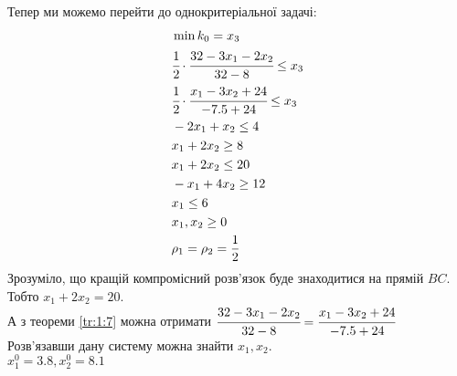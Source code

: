 \begin{exs}
Тепер ми можемо перейти до однокритеріальної задачі:
\begin{eqnarray*}
&\min k_0=x_3 \\
&\cfrac12 \cdot \cfrac{32-3x_1-2x_2}{32-8} \leq x_3 \\
&\cfrac12 \cdot \cfrac{x_1-3x_2+24}{-7.5+24} \leq x_3 \\
&-2x_1+x_2 \leq 4 \\
&x_1 + 2x_2 \geq 8 \\
&x_1 + 2x_2 \leq 20 \\
&-x_1 + 4x_2 \geq 12 \\
&x_1 \leq 6 \\
&x_1,x_2 \geq 0 \\
&\rho_1=\rho_2=\frac12
\end{eqnarray*}
Зрозуміло, що кращій компромісний розв’язок буде знаходитися на прямій $BC$. Тобто $x_1+2x_2=20$.\\
А з теореми \ref{tr:1:7} можна отримати $\cfrac{32-3x_1-2x_2}{32-8}=\cfrac{x_1-3x_2+24}{-7.5+24}$\\
Розв’язавши дану систему можна знайти $x_1,x_2$.\\
$x_1^0=3.8,x_2^0=8.1$
\end{exs}